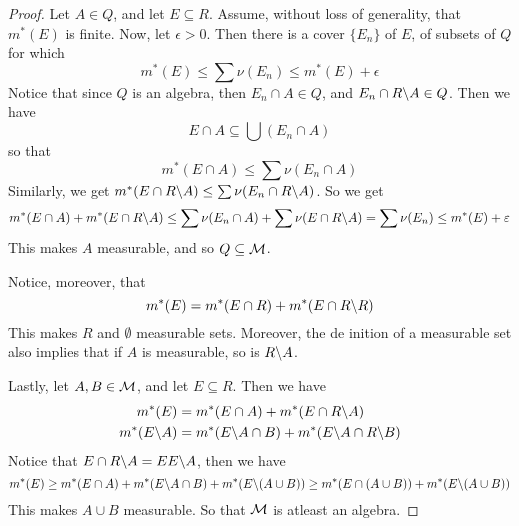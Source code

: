 \begin{proof}
    Let $A \in Q$, and let  $E \subseteq R$. Assume, without loss of
    generality, that  $m^*(E)$ is finite. Now, let $\epsilon>0$. Then there is a
   cover $\{E_n\}$ of $E$, of subsets of $Q$ for which
    \begin{equation*}
        m^*(E) \leq \sum{\nu(E_n)} \leq m^*(E)+\epsilon
    \end{equation*}
    Notice that since $Q$ is an algebra, then $E_n \cap A \in Q$, and  $E_n \cap
    R\backslash A \in Q$. Then we have
    \begin{equation*}
        E \cap A \subseteq \bigcup{(E_n \cap A)}
    \end{equation*}
    so that
    \begin{equation*}
        m^*(E \cap A) \leq \sum{\nu(E_n \cap A)}
    \end{equation*}
    Similarly, we get $m^*(E \cap R\backslash A) \leq \sum{\nu(E_n \cap
    R\backslash A)}$. So we get
    \begin{equation*}
        m^*(E \cap A)+m^*(E \cap R\backslash A) \leq \sum{\nu(E_n \cap
        A)}+\sum{\nu(E \cap R\backslash A)}=\sum{\nu(E_n)} \leq m^*(E)+\varepsilon
    \end{equation*}
    This makes $A$ measurable, and so $Q \subseteq \mathcal{M}$.

    Notice, moreover, that
    \begin{equation*}
        m^*(E)=m^*(E \cap R)+m^*(E \cap R\backslash R)
    \end{equation*}
    This makes $R$ and $\emptyset$ measurable sets. Moreover, the de inition of
    a measurable set also implies that if $A$ is measurable, so is $R\backslash A$.

    Lastly, let $A,B \in \mathcal{M}$, and let $E \subseteq R$. Then we have
    \begin{align*}
        m^*(E)  &=  m^*(E \cap A)+m^*(E \cap R\backslash A)    \\
        m^*(E\backslash A)  &=  m^*(E\backslash A \cap B)+m^*(E\backslash A \cap R\backslash B)    \\
    \end{align*}
    Notice that $E \cap R\backslash A=E E\backslash A$, then we have
    \begin{equation*}
        m^*(E) \geq m^*(E \cap A)+m^*(E\backslash A \cap B)+m^*(E\backslash(A \cup
        B)) \geq m^*(E \cap (A \cup B))+m^*(E\backslash(A \cup B))
    \end{equation*}
    This makes $A \cup B$ measurable. So that  $\mathcal{M}$ is atleast an algebra.
\end{proof}

